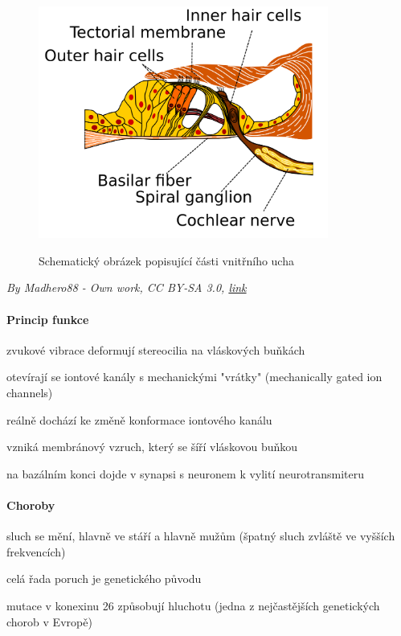 \documentclass[DIV=8]{scrreprt}
\begin{document}
\begin{figure}
    \caption{Schematický obrázek popisující části vnitřního ucha}
    \includegraphics[width=0.85\textwidth]{ucho.png}
    \centering
    \label{}
\end{figure}

\emph{By Madhero88 - Own work, CC BY-SA 3.0, \href{https://commons.wikimedia.org/w/index.php?curid=6888273}{link}}

\paragraph{Princip funkce}
\begin{myEnumerate}[nosep]
    \item zvukové vibrace deformují stereocilia na vláskových buňkách
    \item otevírají se iontové kanály s mechanickými "vrátky" (mechanically gated ion channels)
\begin{myItemize}[nosep]
    \item reálně dochází ke změně konformace iontového kanálu
\end{myItemize}

    \item vzniká membránový vzruch, který se šíří vláskovou buňkou
    \item na bazálním konci dojde v synapsi s neuronem k vylití neurotransmiteru
\end{myEnumerate}



\paragraph{Choroby}
\begin{myItemize}[nosep]
    \item sluch se mění, hlavně ve stáří a hlavně mužům (špatný sluch zvláště ve vyšších frekvencích)
    \item celá řada poruch je genetického původu
\begin{myItemize}[nosep]
    \item mutace v konexinu 26 způsobují hluchotu (jedna z nejčastějších genetických chorob v Evropě)
\end{myItemize}

\end{myItemize}
\end{document}
